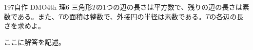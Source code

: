 \begin{prob}{197}{\maru}{自作 DMO4th 理6}
 三角形$T$の1つの辺の長さは平方数で、残りの辺の長さは素数である。また、$T$の面積は整数で、外接円の半径は素数である。$T$の各辺の長さを求めよ。
\end{prob}
ここに解答を記述。